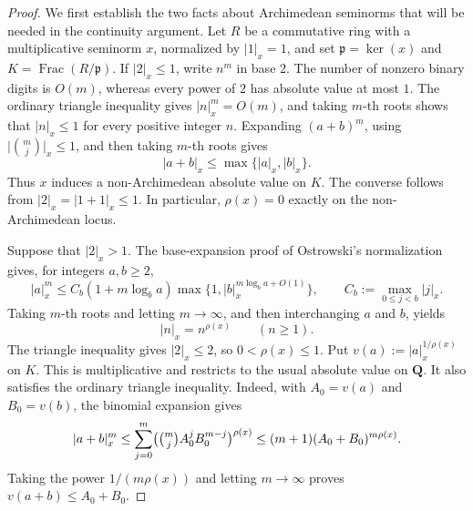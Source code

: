 \begin{proof}
We first establish the two facts about Archimedean seminorms that will be
needed in the continuity argument.  Let \(R\) be a commutative ring with a
multiplicative seminorm \(x\), normalized by \(|1|_x=1\), and set
\(\mathfrak p=\ker(x)\) and
\(K=\operatorname{Frac}(R/\mathfrak p)\).  If \(|2|_x\leq 1\), write
\(n^m\) in base \(2\).  The number of nonzero binary digits is \(O(m)\),
whereas every power of \(2\) has absolute value at most \(1\).  The ordinary
triangle inequality gives \(|n|_x^m=O(m)\), and taking \(m\)-th roots shows
that \(|n|_x\leq 1\) for every positive integer \(n\).  Expanding
\((a+b)^m\), using
\(\bigl|\binom mj\bigr|_x\leq 1\), and then taking \(m\)-th roots gives
\[
 |a+b|_x\leq\max\{|a|_x,|b|_x\}.
\]
Thus \(x\) induces a non-Archimedean absolute value on \(K\).  The converse
follows from \(|2|_x=|1+1|_x\leq 1\).  In particular,
\(\rho(x)=0\) exactly on the non-Archimedean locus.

Suppose that \(|2|_x>1\).  The base-expansion proof of Ostrowski's
normalization gives, for integers \(a,b\geq 2\),
\[
 |a|_x^m\leq C_b(1+m\log_ba)
 \max\{1,|b|_x^{m\log_ba+O(1)}\},
 \qquad
 C_b:=\max_{0\leq j<b}|j|_x.
\]
Taking \(m\)-th roots and letting \(m\to\infty\), and then interchanging
\(a\) and \(b\), yields
\[
 |n|_x=n^{\rho(x)}\qquad(n\geq 1).
\]
The triangle inequality gives \(|2|_x\leq 2\), so
\(0<\rho(x)\leq 1\).  Put \(v(a):=|a|_x^{1/\rho(x)}\) on \(K\).  This is
multiplicative and restricts to the usual absolute value on \(\mathbf Q\).
It also satisfies the ordinary triangle inequality.  Indeed, with
\(A_0=v(a)\) and \(B_0=v(b)\), the binomial expansion gives
\[
 |a+b|_x^m
 \leq\sum_{j=0}^m
 \bigl(\tbinom mj A_0^jB_0^{m-j}\bigr)^{\rho(x)}
 \leq(m+1)(A_0+B_0)^{m\rho(x)}.
\]
Taking the power \(1/(m\rho(x))\) and letting \(m\to\infty\) proves
\(v(a+b)\leq A_0+B_0\).


\end{proof}
